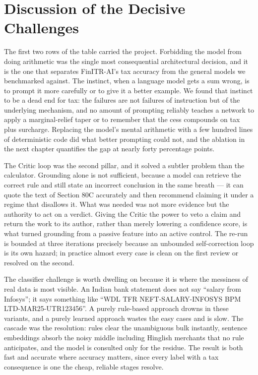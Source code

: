 \section*{Discussion of the Decisive Challenges}

The first two rows of the table carried the project. Forbidding the model from
doing arithmetic was the single most consequential architectural decision, and
it is the one that separates FinITR-AI's tax accuracy from the general models we
benchmarked against. The instinct, when a language model gets a sum wrong, is to
prompt it more carefully or to give it a better example. We found that instinct
to be a dead end for tax: the failures are not failures of instruction but of
the underlying mechanism, and no amount of prompting reliably teaches a network
to apply a marginal-relief taper or to remember that the cess compounds on tax
plus surcharge. Replacing the model's mental arithmetic with a few hundred lines
of deterministic code did what better prompting could not, and the ablation in
the next chapter quantifies the gap at nearly forty percentage points.

The Critic loop was the second pillar, and it solved a subtler problem than the
calculator. Grounding alone is not sufficient, because a model can retrieve the
correct rule and still state an incorrect conclusion in the same breath --- it
can quote the text of Section 80C accurately and then recommend claiming it
under a regime that disallows it. What was needed was not more evidence but the
authority to act on a verdict. Giving the Critic the power to veto a claim and
return the work to its author, rather than merely lowering a confidence score,
is what turned grounding from a passive feature into an active control. The
re-run is bounded at three iterations precisely because an unbounded
self-correction loop is its own hazard; in practice almost every case is clean
on the first review or resolved on the second.

The classifier challenge is worth dwelling on because it is where the messiness
of real data is most visible. An Indian bank statement does not say ``salary from
Infosys''; it says something like ``WDL TFR NEFT-SALARY-INFOSYS BPM
LTD-MAR25-UTR123456''. A purely rule-based approach drowns in these variants,
and a purely learned approach wastes the easy cases and is slow. The cascade was
the resolution: rules clear the unambiguous bulk instantly, sentence embeddings
absorb the noisy middle including Hinglish merchants that no rule anticipates,
and the model is consulted only for the residue. The result is both fast and
accurate where accuracy matters, since every label with a tax consequence is one
the cheap, reliable stages resolve.

